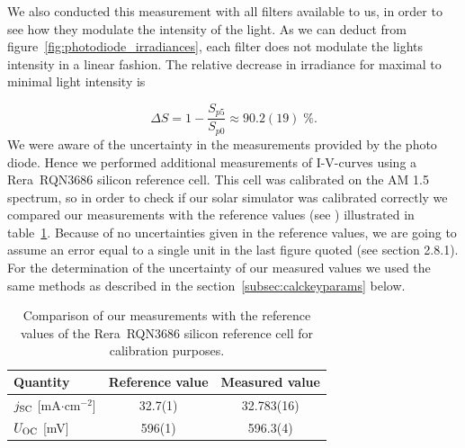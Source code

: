We also conducted this measurement with all filters available to us, in order to see how they modulate the intensity of the light. As we can deduct from figure~\ref{fig:photodiode_irradiances}, each filter does not modulate the lights intensity in a linear fashion. The relative decrease in irradiance for maximal to minimal light intensity is

\begin{equation}\label{eq:irrad-decrease}
\Delta S = 1 - \frac{S_{p5}}{S_{p0}} \approx 90.2(19)\;\%.
\end{equation}
We were aware of the uncertainty in the measurements provided by the photo diode. Hence we performed additional measurements of I-V-curves using a Rera~RQN3686 silicon reference cell. This cell was calibrated on the AM 1.5 spectrum, so in order to check if our solar simulator was calibrated correctly we compared our measurements with the reference values (see \cite{reracat}) illustrated in table~\ref{tab:reracomp}. Because of no uncertainties given in the reference values, we are going to assume an error equal to a single unit in the last figure quoted (see \cite{measurements} section 2.8.1). For the determination of the uncertainty of our measured values we used the same methods as described in the section~\ref{subsec:calckeyparams} below.
\begin{table}[h]\centering
\caption{Comparison of our measurements with the reference values of the Rera~RQN3686 silicon reference cell for calibration purposes.}
\label{tab:reracomp}
\begin{tabular}{@{}lcc@{}}\toprule
Quantity & Reference value & Measured value\\ \midrule
$j_{\text{SC}}$ [mA$\cdot$cm$^{-2}$] & 32.7(1) & 32.783(16) \\
$U_{\text{OC}}$ [mV]& 596(1) & 596.3(4) \\ \bottomrule
\end{tabular}
\end{table}

